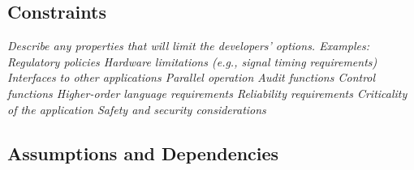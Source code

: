 \subsection{Constraints}
\label{description:constraints}
\textit{Describe any properties that will limit the developers’ options. Examples:
Regulatory policies
Hardware limitations (e.g., signal timing requirements)
Interfaces to other applications
Parallel operation
Audit functions
Control functions
Higher-order language requirements
Reliability requirements
Criticality of the application
Safety and security considerations}

\subsection{Assumptions and Dependencies}
\label{description:assumptions}

